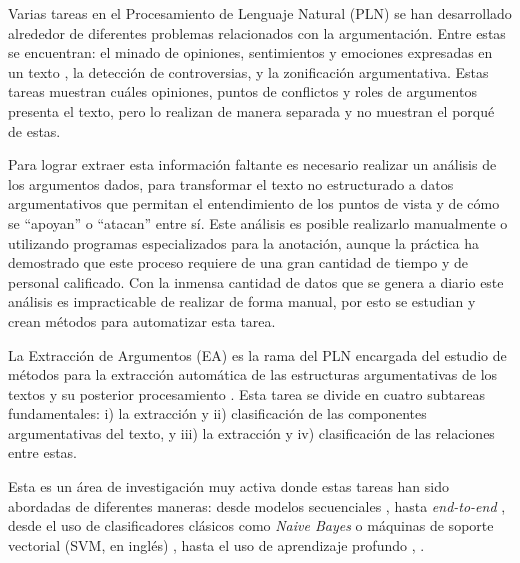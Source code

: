 \documentclass[a4paper,11pt,twocolumn,twoside]{article}
\begin{document}

Varias tareas en el Procesamiento de Lenguaje Natural (PLN) se han desarrollado alrededor
de diferentes problemas relacionados con 
la argumentación. Entre estas se encuentran: el minado de opiniones, sentimientos y 
emociones expresadas en un texto 
\cite{liu2010sentiment}, la detección de controversias, y la zonificación
argumentativa. Estas tareas muestran cuáles opiniones, puntos de conflictos y roles 
de argumentos 
presenta el texto, pero lo realizan de manera separada y no muestran el porqué de estas. 

Para lograr extraer esta información faltante es necesario realizar un 
análisis de los argumentos dados, para transformar el texto no estructurado a datos argumentativos 
que permitan el entendimiento de los puntos de vista y de cómo se ``apoyan'' o ``atacan'' entre sí. Este análisis
es posible realizarlo manualmente o utilizando programas
especializados para la anotación, aunque la práctica ha demostrado que este proceso requiere 
de una gran cantidad de tiempo y de personal calificado. Con la inmensa cantidad de datos 
que se genera a diario este análisis es impracticable de realizar de forma manual, por esto se 
estudian y crean métodos para automatizar esta tarea.


La Extracción de Argumentos (EA) es la rama del PLN encargada
del estudio de métodos para la extracción automática de las estructuras argumentativas de 
los textos y su posterior procesamiento \cite{lawrence2020argument}. Esta tarea se divide en 
cuatro subtareas fundamentales: i) la extracción y ii) clasificación de las componentes 
argumentativas del texto, y iii) la extracción y 
iv) clasificación de las relaciones entre estas. 

Esta es un área de investigación muy activa donde estas tareas han sido abordadas de diferentes maneras:
desde modelos secuenciales \cite{palau2009argumentation}, \cite{goudas2015argument} hasta 
\textit{end-to-end} \cite{eger2017neural}, desde el uso de clasificadores clásicos 
como \textit{Naive Bayes} o máquinas de soporte vectorial (SVM, en inglés) \cite{niculae2017argument}, \cite{stab2017parsing} hasta el uso de 
aprendizaje profundo \cite{galassi2021deep}, \cite{mayer2020transformer}.
\end{document}
